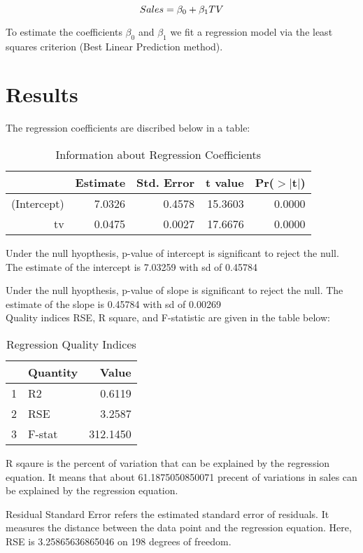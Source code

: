 \documentclass{article}
\begin{document}
$$\\Sales = \beta_{0} + \beta_{1}TV$$ 

To estimate the coefficients $\beta_{0}$ and $\beta_{1}$ we fit a regression model via the least squares criterion (Best Linear Prediction method).

\section{Results}
The regression coefficients are discribed below in a table:

\begin{table}[ht]
\centering
\begin{tabular}{rrrrr}
  \hline
 & Estimate & Std. Error & t value & Pr($>$$|$t$|$) \\ 
  \hline
(Intercept) & 7.0326 & 0.4578 & 15.3603 & 0.0000 \\ 
  tv & 0.0475 & 0.0027 & 17.6676 & 0.0000 \\ 
   \hline
\end{tabular}
\caption{Information about Regression Coefficients} 
\end{table}   
Under the null hyopthesis, p-value of intercept is significant to reject the null. The estimate of the   intercept is 7.03259 with sd of 0.45784

Under the null hyopthesis, p-value of slope is significant to reject the null. The estimate of the slope is 0.45784 with sd of 0.00269\\

Quality indices RSE, R square, and F-statistic are given in the table below: 

\begin{table}[ht]
\centering
\begin{tabular}{rlr}
  \hline
 & Quantity & Value \\ 
  \hline
1 & R2 & 0.6119 \\ 
  2 & RSE & 3.2587 \\ 
  3 & F-stat & 312.1450 \\ 
   \hline
\end{tabular}
\caption{Regression Quality Indices} 
\end{table}

R sqaure is the percent of variation that can be explained by the regression equation. It means that about 61.1875050850071 precent of variations in sales can be explained by the regression equation.

Residual Standard Error refers the estimated standard error of residuals. It measures the distance between the data point and the regression equation. Here, RSE is 3.25865636865046 on 198 degrees of freedom.
\end{document}
